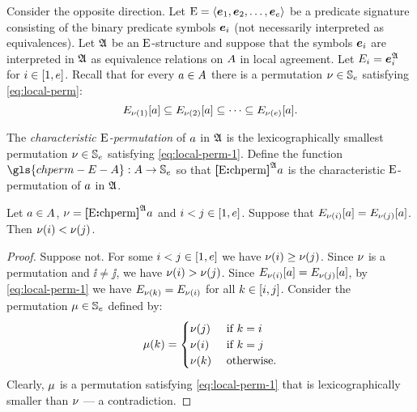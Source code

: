 Consider the opposite direction.
Let $\mathrm{E} = \left\langle \bm{e}_{1},\bm{e}_{2},\dots,\bm{e}_{e} \right\rangle$ be a predicate signature consisting
of the binary predicate symbols $\bm{e}_{i}$ (not necessarily interpreted as
equivalences).
Let $\mathfrak{A}$ be an $\mathrm{E}$-structure and suppose that the symbols $\bm{e}_{i}$ are
interpreted in $\mathfrak{A}$ as equivalence relations on $A$ in local agreement.
Let $E_{i} = \bm{e}_{i}^{\mathfrak{A}}$ for $i \in [1,e]$.
Recall that for every $a \in A$ there is a permutation
$\nu \in \mathbb{S}_{e}$ satisfying \cref{eq:local-perm}:
\begin{equation}\label{eq:local-perm-1}
  E_{\nu(1)}[a] \subseteq
  E_{\nu(2)}[a] \subseteq \dots \subseteq
  E_{\nu(e)}[a].
\end{equation}
\begin{definition}
The \emph{characteristic $\mathrm{E}$-permutation} of $a$ in $\mathfrak{A}$ is
the lexicographically smallest permutation $\nu \in \mathbb{S}_{e}$
satisfying \cref{eq:local-perm-1}.
Define the function $\gls{chperm-E-A} : \domA \to \Perms\sze$ so
that ${\bm{[}\mathrm{E}\mathord{\bm{:}}\mathrm{chperm}\bm{]}}^{\mathfrak{A}}a$ is the characteristic $\mathrm{E}$-permutation of $a$ in
$\mathfrak{A}$.
\end{definition}
\begin{remark}\label{rem:local-eq-perm}
Let $a \in A$, $\nu = {\bm{[}\mathrm{E}\mathord{\bm{:}}\mathrm{chperm}\bm{]}}^{\mathfrak{A}}a$ and
$i < j \in [1,e]$.
Suppose that $E_{\nu(i)}[a] = E_{\nu(j)}[a]$.
Then $\nu(i) < \nu(j)$.
\end{remark}
\begin{proof}
Suppose not. For some $i < j \in [1,e]$ we have
$\nu(i) \geq \nu(j)$.
Since $\nu$ is a permutation and $\ii \neq \jj$,
we have $\nu(i) > \nu(j)$.
Since $E_{\nu(i)}[a] = E_{\nu(j)}[a]$,
by \cref{eq:local-perm-1} we have $E_{\nu(k)} = E_{\nu(i)}$
for all $k \in [i, j]$.
Consider the permutation $\mu \in \mathbb{S}_{e}$ defined by:
\[
  \mu(k) = \begin{cases}
    \nu(j) &\text{ if } k = i \\
    \nu(i) &\text{ if } k = j \\
    \nu(k) &\text{ otherwise.}
  \end{cases}
\]
Clearly, $\mu$ is a permutation satisfying \cref{eq:local-perm-1} that is
lexicographically smaller than $\nu$ --- a contradiction.
\end{proof}

